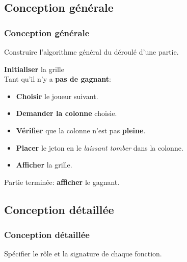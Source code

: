 \documentclass[svgnames,11pt]{beamer}
\begin{document}
\subsection{Conception générale}
\begin{frame}
    \frametitle{Conception générale}

    \begin{aretenir}[Rôle]
    Construire l'algorithme général du déroulé d'une partie.
    \end{aretenir}

\end{frame}
\begin{frame}

    \textbf{Initialiser} la grille\\
    Tant qu'il n'y a \textbf{pas de gagnant}:
    \begin{itemize}
        \item \textbf{Choisir} le joueur suivant.
        \item \textbf{Demander la colonne} choisie.
        \item \textbf{Vérifier} que la colonne n'est pas \textbf{pleine}.
        \item \textbf{Placer} le jeton en le \emph{laissant tomber} dans la colonne.
        \item \textbf{Afficher} la grille.
    \end{itemize}
    Partie terminée: \textbf{afficher} le gagnant.
\end{frame}
\subsection{Conception détaillée}
\begin{frame}
    \frametitle{Conception détaillée}

    \begin{aretenir}[Rôle]
    Spécifier le rôle et la signature de chaque fonction.
    \end{aretenir}

\end{frame}
\end{document}
